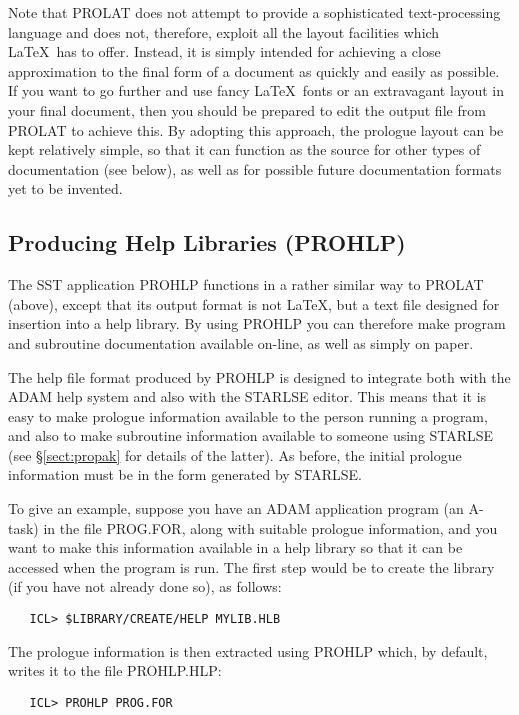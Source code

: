 Note that PROLAT does not attempt to provide a sophisticated text-processing
language and does not, therefore, exploit all the layout facilities which
\LaTeX\ has to offer. 
Instead, it is simply intended for achieving a close approximation to the
final form of a document as quickly and easily as possible. 
If you want to go further and use fancy \LaTeX\ fonts or an extravagant layout
in your final document, then you should be prepared to edit the output file
from PROLAT to achieve this. 
By adopting this approach, the prologue layout can be kept relatively
simple, so that it can function as the source for other types of
documentation (see below), as well as for possible future documentation
formats yet to be invented. 

\subsection{Producing Help Libraries (PROHLP)}

The SST application PROHLP functions in a rather similar way to PROLAT
(above), except that its output format is not \LaTeX, but a text file
designed for insertion into a help library. 
By using PROHLP you can therefore make program and subroutine documentation
available on-line, as well as simply on paper. 

The help file format produced by PROHLP is designed to integrate both with
the ADAM help system and also with the STARLSE editor. 
This means that it is easy to make prologue information available to the
person running a program, and also to make subroutine information available
to someone using STARLSE (see \S\ref{sect:propak} for details of the
latter). 
As before, the initial prologue information must be in the form generated by
STARLSE. 

To give an example, suppose you have an ADAM application program (an A-task)
in the file PROG.FOR, along with suitable prologue information, and you want
to make this information available in a help library so that it can be
accessed when the program is run. 
The first step would be to create the library (if you have not already done
so), as follows: 

\begin{verbatim}
   ICL> $LIBRARY/CREATE/HELP MYLIB.HLB
\end{verbatim}

The prologue information is then extracted using PROHLP which, by default,
writes it to the file PROHLP.HLP: 

\begin{verbatim}
   ICL> PROHLP PROG.FOR
\end{verbatim}

